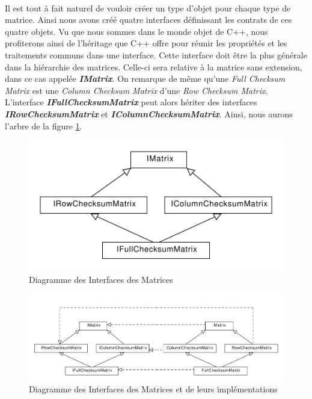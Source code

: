 \documentclass[a4paper, 10pt]{report}
\begin{document}
\paragraph*{}
Il est tout à fait naturel de vouloir créer un type d’objet pour chaque type de matrice. Ainsi nous avons créé quatre 
interfaces définissant les contrats de ces quatre objets. Vu que nous sommes dans le monde objet de C++, nous profiterons 
ainsi de l’héritage que C++ offre pour réunir les propriétés et les traitements communs dans une interface. Cette interface 
doit être la plus générale dans la hiérarchie des matrices. Celle-ci sera relative à la matrice sans extension, dans ce cas 
appelée \textbf{\textit{IMatrix}}. On remarque de même qu’une \textit{Full Checksum Matrix} est une \textit{Column Checksum Matrix} 
d’une \textit{Row Checksum Matrix}. L’interface \textbf{\textit{IFullChecksumMatrix}} peut alors hériter des interfaces 
\textbf{\textit{IRowChecksumMatrix}} et \textbf{\textit{IColumnChecksumMatrix}}.
Ainsi, nous aurons l’arbre de la figure \ref{fig:Diag1}.\newline
\begin{figure}
 \center
 \includegraphics[scale=0.5]{MatricesHierarchie.pdf}
 \caption{Diagramme des Interfaces des Matrices}
  \label{fig:Diag1}
\end{figure}

\begin{figure}
 \center
 \includegraphics[scale=0.35]{MatricesHierarchie2.pdf}
 \caption{Diagramme des Interfaces des Matrices et de leurs implémentations}
  \label{fig:Diag2}
\end{figure}
\end{document}

